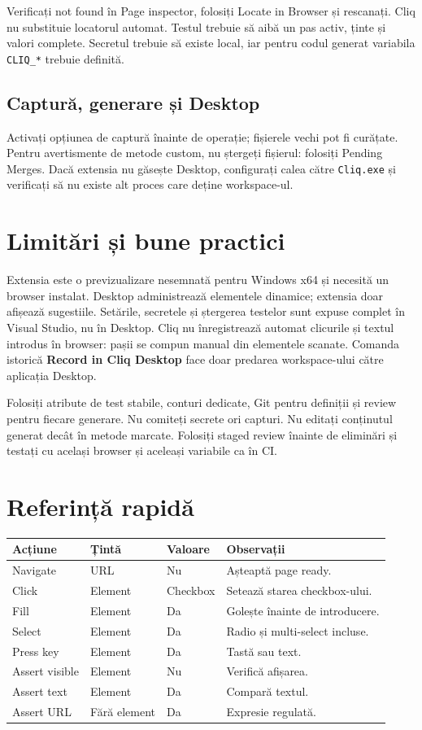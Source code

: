 \documentclass[12pt,a4paper]{report}
\newcommand{\UI}[1]{\textbf{#1}}
\newcommand{\File}[1]{\nolinkurl{#1}}
\begin{document}
Verificați not found în Page inspector, folosiți Locate in Browser și rescanați. Cliq nu substituie locatorul automat. Testul trebuie să aibă un pas activ, ținte și valori complete. Secretul trebuie să existe local, iar pentru codul generat variabila \File{CLIQ_*} trebuie definită.

\section{Captură, generare și Desktop}

Activați opțiunea de captură înainte de operație; fișierele vechi pot fi curățate. Pentru avertismente de metode custom, nu ștergeți fișierul: folosiți Pending Merges. Dacă extensia nu găsește Desktop, configurați calea către \File{Cliq.exe} și verificați să nu existe alt proces care deține workspace-ul.

\chapter{Limitări și bune practici}

Extensia este o previzualizare nesemnată pentru Windows x64 și necesită un browser instalat. Desktop administrează elementele dinamice; extensia doar afișează sugestiile. Setările, secretele și ștergerea testelor sunt expuse complet în Visual Studio, nu în Desktop. Cliq nu înregistrează automat clicurile și textul introdus în browser: pașii se compun manual din elementele scanate. Comanda istorică \UI{Record in Cliq Desktop} face doar predarea workspace-ului către aplicația Desktop.

Folosiți atribute de test stabile, conturi dedicate, Git pentru definiții și review pentru fiecare generare. Nu comiteți secrete ori capturi. Nu editați conținutul generat decât în metode marcate. Folosiți staged review înainte de eliminări și testați cu același browser și aceleași variabile ca în CI.

\appendix
\chapter{Referință rapidă}

\begin{tabularx}{\textwidth}{@{}p{2.8cm}p{3.0cm}p{3.0cm}Y@{}}
\toprule \textbf{Acțiune} & \textbf{Țintă} & \textbf{Valoare} & \textbf{Observații} \\
\midrule
Navigate & URL & Nu & Așteaptă page ready. \\
Click & Element & Checkbox & Setează starea checkbox-ului. \\
Fill & Element & Da & Golește înainte de introducere. \\
Select & Element & Da & Radio și multi-select incluse. \\
Press key & Element & Da & Tastă sau text. \\
Assert visible & Element & Nu & Verifică afișarea. \\
Assert text & Element & Da & Compară textul. \\
Assert URL & Fără element & Da & Expresie regulată. \\
\bottomrule
\end{tabularx}
\end{document}
